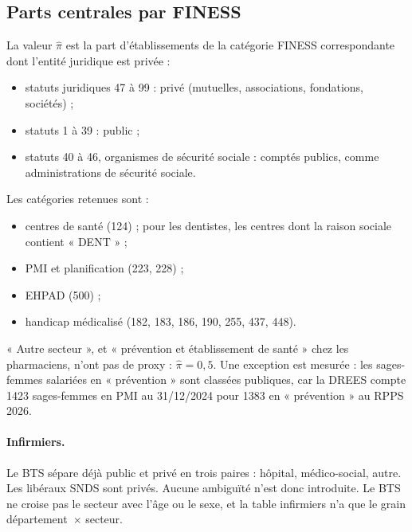 \subsection{Parts centrales par FINESS}
La valeur $\hat\pi$ est la part d'établissements de la catégorie FINESS correspondante dont l'entité juridique est
privée :
\begin{itemize}
  \item statuts juridiques 47 à 99 : privé (mutuelles, associations, fondations, sociétés) ;
  \item statuts 1 à 39 : public ;
  \item statuts 40 à 46, organismes de sécurité sociale : comptés publics, comme administrations de sécurité
  sociale.
\end{itemize}
Les catégories retenues sont :
\begin{itemize}
  \item centres de santé (124) ; pour les dentistes, les centres dont la raison sociale contient « DENT » ;
  \item PMI et planification (223, 228) ;
  \item EHPAD (500) ;
  \item handicap médicalisé (182, 183, 186, 190, 255, 437, 448).
\end{itemize}
« Autre secteur », et « prévention et établissement de santé » chez les pharmaciens, n'ont pas de proxy :
$\hat\pi = 0{,}5$\suppose{}. Une exception est mesurée : les sages-femmes salariées en « prévention » sont
classées publiques, car la DREES compte \num{1423} sages-femmes en PMI au 31/12/2024 pour \num{1383} en
« prévention » au RPPS 2026\mesure{}.

\paragraph{Infirmiers.} Le BTS sépare déjà public et privé en trois paires : hôpital, médico-social, autre. Les
libéraux SNDS sont privés. Aucune ambiguïté n'est donc introduite. Le BTS ne croise pas le secteur avec l'âge ou
le sexe, et la table infirmiers n'a que le grain département~$\times$ secteur.


